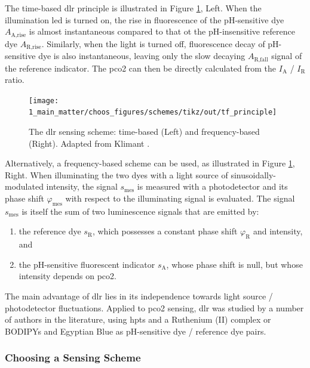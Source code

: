 The time-based \gls{dlr} principle is illustrated in Figure \ref{fig:choos:dye_based:advanced:tf_principle}, Left. When the illumination \gls{led} is turned on, the rise in fluorescence of the pH-sensitive dye $A_\text{A,rise}$ is almost instantaneous compared to that ot the pH-insensitive reference dye $A_\text{R,rise}$. Similarly, when the light is turned off, fluorescence decay of pH-sensitive dye is also instantaneous, leaving only the slow decaying $A_\text{R,fall}$ signal of the reference indicator. The \gls{pco2} can then be directly calculated from the $I_\text{A}$ / $I_\text{R}$ ratio\cite{klimant2001_pap}.

\begin{figure}
	\centering
	\texttt{[image: 1\_main\_matter/choos\_figures/schemes/tikz/out/tf\_principle]}
	\caption[The \gls{dlr} sensing scheme.]{The \gls{dlr} sensing scheme: time-based (Left) and frequency-based (Right). Adapted from Klimant \etal{}\cite{klimant2001_pap}.}
	\label{fig:choos:dye_based:advanced:tf_principle}
\end{figure}

Alternatively, a frequency-based scheme can be used, as illustrated in Figure \ref{fig:choos:dye_based:advanced:tf_principle}, Right. When illuminating the two dyes with a light source of sinusoidally-modulated intensity, the signal $s_\text{mes}$ is measured with a photodetector and its phase shift $\varphi_\text{mes}$ with respect to the illuminating signal is evaluated. The signal $s_\text{mes}$ is itself the sum of two luminescence signals that are emitted by:
\begin{enumerate}
	\item the reference dye $s_\text{R}$, which possesses a constant phase shift $\varphi_\text{R}$ and intensity, and
	\item the pH-sensitive fluorescent indicator $s_\text{A}$, whose phase shift is null, but whose intensity depends on \gls{pco2}\cite{klimant2001_pap}.
\end{enumerate}

The main advantage of \gls{dlr} lies in its independence towards light source / photodetector fluctuations. Applied to \gls{pco2} sensing, \gls{dlr} was studied by a number of authors in the literature, using \gls{hpts} and a Ruthenium (II) complex\cite{bultzingslowen2002, burke2006, cajlakovic2006} or BODIPYs and Egyptian Blue\cite{fritzsche2017, staudinger2018, pfeifer2020} as pH-sensitive dye / reference dye pairs.

\subsubsection{Choosing a Sensing Scheme}

